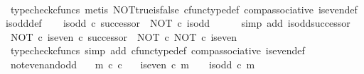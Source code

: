 \begin{isabellebody}
\ \ \ \ \isamarkupfalse%
\ {\isacharparenleft}{\kern0pt}typecheck{\isacharunderscore}{\kern0pt}cfuncs{\isacharcomma}{\kern0pt}\ metis\ NOT{\isacharunderscore}{\kern0pt}true{\isacharunderscore}{\kern0pt}is{\isacharunderscore}{\kern0pt}false\ cfunc{\isacharunderscore}{\kern0pt}type{\isacharunderscore}{\kern0pt}def\ comp{\isacharunderscore}{\kern0pt}associative\ is{\isacharunderscore}{\kern0pt}even{\isacharunderscore}{\kern0pt}def{}\ is{\isacharunderscore}{\kern0pt}odd{\isacharunderscore}{\kern0pt}def{}{\isacharparenright}{\kern0pt}\isanewline
\isanewline
\ \ \isamarkupfalse%
\ {\isachardoublequoteopen}is{\isacharunderscore}{\kern0pt}odd\ {\isasymcirc}\isactrlsub c\ successor\ {\isacharequal}{\kern0pt}\ NOT\ {\isasymcirc}\isactrlsub c\ is{\isacharunderscore}{\kern0pt}odd{\isachardoublequoteclose}\isanewline
\ \ \ \ \isamarkupfalse%
\ {\isacharparenleft}{\kern0pt}simp\ add{\isacharcolon}{\kern0pt}\ is{\isacharunderscore}{\kern0pt}odd{\isacharunderscore}{\kern0pt}successor{\isacharparenright}{\kern0pt}\isanewline
\isanewline
\ \ \isamarkupfalse%
\ {\isachardoublequoteopen}{\isacharparenleft}{\kern0pt}NOT\ {\isasymcirc}\isactrlsub c\ is{\isacharunderscore}{\kern0pt}even{\isacharparenright}{\kern0pt}\ {\isasymcirc}\isactrlsub c\ successor\ {\isacharequal}{\kern0pt}\ NOT\ {\isasymcirc}\isactrlsub c\ NOT\ {\isasymcirc}\isactrlsub c\ is{\isacharunderscore}{\kern0pt}even{\isachardoublequoteclose}\isanewline
\ \ \ \ \isamarkupfalse%
\ {\isacharparenleft}{\kern0pt}typecheck{\isacharunderscore}{\kern0pt}cfuncs{\isacharcomma}{\kern0pt}\ simp\ add{\isacharcolon}{\kern0pt}\ cfunc{\isacharunderscore}{\kern0pt}type{\isacharunderscore}{\kern0pt}def\ comp{\isacharunderscore}{\kern0pt}associative\ is{\isacharunderscore}{\kern0pt}even{\isacharunderscore}{\kern0pt}def{}{\isacharparenright}{\kern0pt}\isanewline
{}\isamarkupfalse%
%
\endisatagproof
{\isafoldproof}%
%
\isadelimproof
\isanewline
%
\endisadelimproof
\isanewline
{}\isamarkupfalse%
\ not{\isacharunderscore}{\kern0pt}even{\isacharunderscore}{\kern0pt}and{\isacharunderscore}{\kern0pt}odd{\isacharcolon}{\kern0pt}\isanewline
\ \ \ {\isachardoublequoteopen}m\ {\isasymin}\isactrlsub c\ {\isasymnat}\isactrlsub c{\isachardoublequoteclose}\isanewline
\ \ \ {\isachardoublequoteopen}{\isasymnot}{\isacharparenleft}{\kern0pt}is{\isacharunderscore}{\kern0pt}even\ {\isasymcirc}\isactrlsub c\ m\ {\isacharequal}{\kern0pt}\ {\isasymt}\ {\isasymand}\ is{\isacharunderscore}{\kern0pt}odd\ {\isasymcirc}\isactrlsub c\ m\ {\isacharequal}{\kern0pt}\ {\isasymt}{\isacharparenright}{\kern0pt}{\isachardoublequoteclose}\isanewline

\end{isabellebody}

